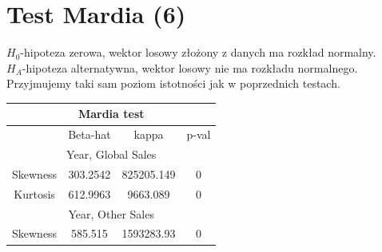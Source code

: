 \documentclass[12pt]{article}
\begin{document}
	\section{Test Mardia (6)}
	\(H_0\)-hipoteza zerowa, wektor losowy złożony z danych ma rozkład normalny.\\
	\(H_A\)-hipoteza alternatywna, wektor losowy nie ma rozkładu normalnego.\\
Przyjmujemy taki sam poziom istotności jak w poprzednich testach.\\
	\begin{table}[H]
		\centering
		\begin{tabular}{|cccc|}
			\hline
			\multicolumn{4}{|c|}{Mardia test}                                                                                                                                                                        \\ \hline
			\multicolumn{1}{|l|}{}                                 & \multicolumn{1}{c|}{\cellcolor[HTML]{FFFFFF}Beta-hat} & \multicolumn{1}{c|}{\cellcolor[HTML]{FFFFFF}kappa}      & \cellcolor[HTML]{FFFFFF}p-val \\ \hline

\multicolumn{4}{|c|}{Year, Global Sales}                                                                                                                                                                       \\ \hline

			\multicolumn{1}{|c|}{\cellcolor[HTML]{FFFFFF}Skewness} & \multicolumn{1}{c|}{\cellcolor[HTML]{FFFFFF}303.2542} & \multicolumn{1}{c|}{\cellcolor[HTML]{FFFFFF}825205.149} & 0                             \\ \hline

			\multicolumn{1}{|c|}{\cellcolor[HTML]{FFFFFF}Kurtosis} & \multicolumn{1}{c|}{\cellcolor[HTML]{FFFFFF}612.9963} & \multicolumn{1}{c|}{\cellcolor[HTML]{FFFFFF}9663.089}   & 0                             \\ \hline


\multicolumn{4}{|c|}{Year, Other Sales}                                                                                                                                                                       \\ \hline

			\multicolumn{1}{|c|}{\cellcolor[HTML]{FFFFFF}Skewness} & \multicolumn{1}{c|}{\cellcolor[HTML]{FFFFFF}585.515} & \multicolumn{1}{c|}{\cellcolor[HTML]{FFFFFF}1593283.93} & 0                             \\ \hline


\end{tabular}
\end{table}
\end{document}
